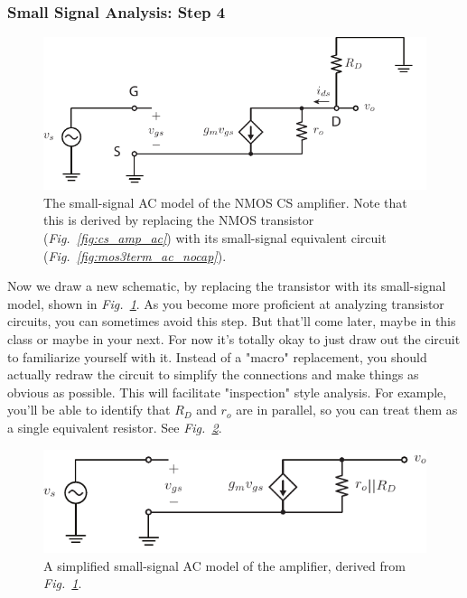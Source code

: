 \subsubsection{Small Signal Analysis:  Step 4}
\begin{figure}[tb]
\centering
\includegraphics[scale=1]{cs_amp_ss1}
\caption{The small-signal AC model of the NMOS CS amplifier. Note that this is derived by replacing the NMOS transistor (\emph{Fig.~\ref{fig:cs_amp_ac}}) with its small-signal equivalent circuit (\emph{Fig.~\ref{fig:mos3term_ac_nocap}}).}
\label{fig:cs_amp_ss1}
\end{figure}
Now we draw a new schematic, by replacing the transistor with its small-signal model, shown in \emph{Fig.~\ref{fig:cs_amp_ss1}}.  As you become more proficient at analyzing transistor circuits, you can sometimes avoid this step. But that'll come later, maybe in this class or maybe in your next.  For now it's totally okay to just draw out the circuit to familiarize yourself with it.
Instead of a "macro" replacement, you should actually redraw the circuit to simplify the connections and make things as obvious as possible. This will facilitate "inspection" style analysis. For example, you'll be able to identify that $R_D$ and $r_o$ are in parallel, so you can treat them as a single equivalent resistor.  See \emph{Fig.~\ref{fig:cs_amp_ss2}}.
\begin{figure}[tb]
\centering
\includegraphics[scale=1]{cs_amp_ss2}
\caption{A simplified small-signal AC model of the amplifier, derived from \emph{Fig.~\ref{fig:cs_amp_ss1}}.} \label{fig:cs_amp_ss2}
\end{figure}
